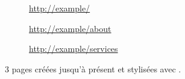 \begin{figure}[!h]
    \begin{subfigure}[c]{0.60\textwidth}
    \end{subfigure}\hfill
    \begin{subfigure}[c]{0.35\textwidth}
        \caption{\url{http://example/}} 
    \end{subfigure}
    \begin{subfigure}[c]{0.60\textwidth}
    \end{subfigure}\hfill
    \begin{subfigure}[c]{0.35\textwidth}
        \caption{\url{http://example/about}}
    \end{subfigure}
    \begin{subfigure}[c]{0.60\textwidth}
    \end{subfigure}\hfill
    \begin{subfigure}[c]{0.35\textwidth}
        \caption{\url{http://example/services}} 
    \end{subfigure}
    \caption{3 pages créées jusqu'à présent et stylisées avec \tailwind{}.}
    \label{fig:3pages}
\end{figure}

